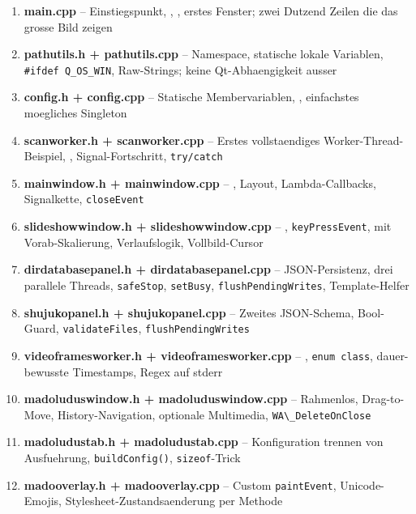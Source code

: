 \begin{enumerate}
  \item \textbf{main.cpp} --
    Einstiegspunkt, , ,
    erstes Fenster; zwei Dutzend Zeilen die das grosse Bild
    zeigen

  \item \textbf{pathutils.h + pathutils.cpp} --
    Namespace, statische lokale Variablen,
    \verb|#ifdef Q_OS_WIN|, Raw-Strings; keine Qt-Abhaengigkeit
    ausser 

  \item \textbf{config.h + config.cpp} --
    Statische Membervariablen, ,
    einfachstes moegliches Singleton

  \item \textbf{scanworker.h + scanworker.cpp} --
    Erstes vollstaendiges Worker-Thread-Beispiel,
    , Signal-Fortschritt,
    \verb|try/catch|

  \item \textbf{mainwindow.h + mainwindow.cpp} --
    , Layout, Lambda-Callbacks,
    Signalkette, \verb|closeEvent|

  \item \textbf{slideshowwindow.h + slideshowwindow.cpp} --
    , \verb|keyPressEvent|,
     mit Vorab-Skalierung,
    Verlaufslogik, Vollbild-Cursor

  \item \textbf{dirdatabasepanel.h + dirdatabasepanel.cpp} --
    JSON-Persistenz, drei parallele Threads,
    \verb|safeStop|, \verb|setBusy|,
    \verb|flushPendingWrites|, Template-Helfer

  \item \textbf{shujukopanel.h + shujukopanel.cpp} --
    Zweites JSON-Schema, Bool-Guard,
    \verb|validateFiles|, \verb|flushPendingWrites|

  \item \textbf{videoframesworker.h + videoframesworker.cpp} --
    , \verb|enum class|,
    dauer-bewusste Timestamps, Regex auf stderr

  \item \textbf{madoluduswindow.h + madoluduswindow.cpp} --
    Rahmenlos, Drag-to-Move, History-Navigation,
    optionale Multimedia, \verb|WA\_DeleteOnClose|

  \item \textbf{madoludustab.h + madoludustab.cpp} --
    Konfiguration trennen von Ausfuehrung,
    \verb|buildConfig()|, \verb|sizeof|-Trick

  \item \textbf{madooverlay.h + madooverlay.cpp} --
    Custom \verb|paintEvent|, Unicode-Emojis,
    Stylesheet-Zustandsaenderung per Methode
\end{enumerate}

